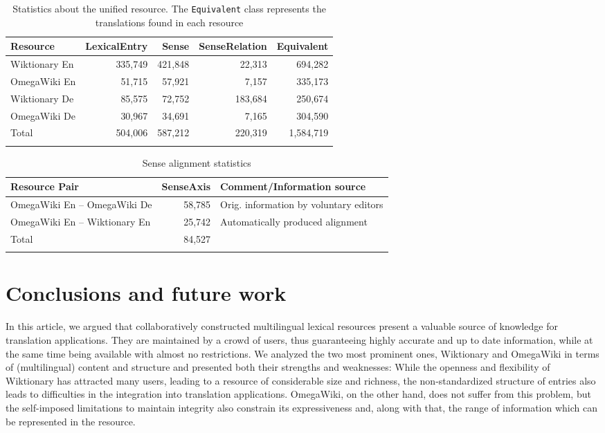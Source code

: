 \documentclass[output=paper]{LSP/langsci}
\begin{document}
\begin{table}
  
  \begin{tabularx}{\textwidth}{X@{\qquad}rrrr}
\lsptoprule
    Resource & LexicalEntry & Sense & SenseRelation & Equivalent\\
    \midrule
    Wiktionary En & 335,749 & 421,848 &  22,313 & 694,282 \\
    OmegaWiki En  &  51,715 &  57,921 &   7,157 & 335,173 \\    
    Wiktionary De &  85,575 &  72,752 & 183,684 & 250,674 \\
    OmegaWiki De  &  30,967 &  34,691 &   7,165 & 304,590 \\  
\midrule
   Total &	504,006	  & 587,212 & 220,319 &  1,584,719 \\
\lsptoprule
  \end{tabularx}
  \caption{Statistics about the unified resource. The \texttt{Equivalent} class represents the translations found in each resource}
  \label{tab:combinedstats}
\end{table}


\begin{table}
  
  \begin{tabularx}{\textwidth}{lrQ}
    \lsptoprule
    Resource Pair &   SenseAxis & Comment/Information source\\
\midrule
OmegaWiki En -- OmegaWiki De &	58,785 & Orig. information by voluntary editors\\
OmegaWiki En -- Wiktionary En & 25,742  & Automatically produced alignment\\
\midrule
  Total &	84,527 	  & \\
  \lspbottomrule
  \end{tabularx}
  \caption{Sense alignment statistics}
  \label{tab:senseaxis}
\end{table}

\section{Conclusions and future work}
\label{sec:matuschek:conclusion}
In this article, we argued that collaboratively constructed multilingual lexical resources present a valuable source of knowledge for translation applications. They are maintained by a crowd of users, thus guaranteeing highly accurate and up to date information, while at the same time being available with almost no restrictions. We analyzed the two most prominent ones, Wiktionary and OmegaWiki in terms of (multilingual) content and structure and presented both their strengths and weaknesses: While the openness and flexibility of Wiktionary has attracted many users, leading to a resource of considerable size and richness, the non-standardized structure of entries also leads to difficulties in the integration into translation applications. OmegaWiki, on the other hand, does not suffer from this problem, but the self-imposed limitations to maintain integrity also constrain its expressiveness and, along with that, the range of information which can be represented 
in the resource. 
\end{document}
